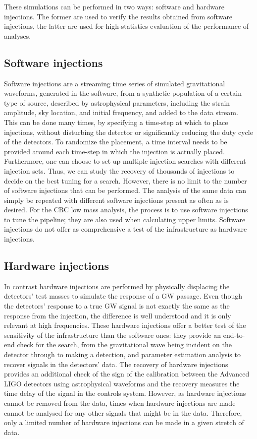 \documentclass[binding=0.6cm, LaM]{sapthesis}
\begin{document}
	These simulations can be performed in two ways: software and hardware injections.
	The former are used to verify the results obtained from software injections, 
	the latter are used for high-statistics evaluation of the performance of analyses. 

\subsection{Software injections}

	Software injections are a streaming time series of simulated gravitational waveforms, 
	generated in the software, from a synthetic population of a certain type of source, 
	described by astrophysical parameters, including the strain amplitude, sky location, 	
	and initial frequency, and added to the data stream. 
	This can be done many times, by specifying a time-step at which to place injections, 
	without disturbing the detector or significantly reducing the duty cycle of the detectors. 
	To randomize the placement, a time interval needs to be provided around 
	each time-step in which the injection is actually placed. 
	Furthermore, one can choose to set up multiple injection searches with different injection sets. 
	Thus, we can study the recovery of thousands of injections to decide on the best tuning for a search. 
	However, there is no limit to the number of software injections that can be performed. 
	The analysis of the same data can simply be repeated with different software injections present as often as is desired. 
	For the CBC low mass analysis, the process is to use software injections to tune the pipeline; 
	they are also used when calculating upper limits.
	Software injections do not offer as comprehensive a test of the infrastructure as hardware injections. 
	
\subsection{Hardware injections}

	In contrast hardware injections are performed by physically displacing
	the detectors’ test masses to simulate the response of a GW passage. 
	Even though the detectors’ response to a true GW signal is not 
	exactly the same as the response from the injection,
	the difference is well understood and it is only relevant at high frequencies.
	These hardware injections offer a better test of the sensitivity of the infrastructure than the software ones:
	they provide an end-to-end check for the search,
	from the gravitational wave being incident on 
	the detector through to making a detection, and parameter estimation analysis to recover signals in the detectors’ data. 
	The recovery of hardware injections provides an additional check 
	of the sign of the calibration between the Advanced LIGO detectors 
	using astrophysical waveforms and the recovery measures 
	the time delay of the signal in the controls system. 
	However, as hardware injections cannot be removed from the data, 
	times when hardware injections are made cannot be analysed 
	for any other signals that might be in the data. 
	Therefore, only a limited number of hardware injections can be made in a given stretch of data. 
\end{document}

